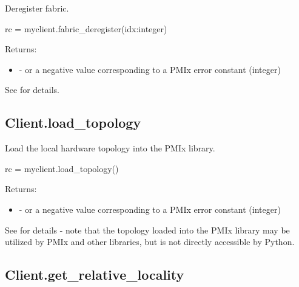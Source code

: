 \summary
Deregister fabric.

\format

\pyspecificstart
\begin{codepar}
rc = myclient.fabric_deregister(idx:integer)
\end{codepar}
\pyspecificend


\begin{arglist}
\end{arglist}

Returns:

\begin{itemize}
    \item {} -  or a negative value corresponding to a PMIx error constant (integer)
\end{itemize}

See  for details.


\subsection{Client.load_topology}

\summary
Load the local hardware topology into the \ac{PMIx} library.

\format

\pyspecificstart
\begin{codepar}
rc = myclient.load_topology()
\end{codepar}
\pyspecificend

Returns:

\begin{itemize}
    \item {} -  or a negative value corresponding to a PMIx error constant (integer)
\end{itemize}

See  for details - note that the topology loaded into the \ac{PMIx} library may be utilized by \ac{PMIx} and other libraries, but is not directly accessible by Python.


\subsection{Client.get_relative_locality}

